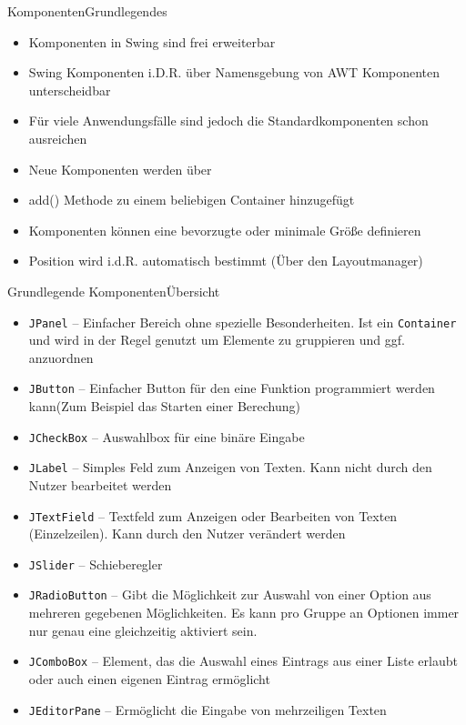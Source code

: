 \begin{frame}{Komponenten}{Grundlegendes}
    \begin{itemize}
        \item Komponenten in Swing sind frei erweiterbar
        \item Swing Komponenten i.D.R. über Namensgebung von AWT Komponenten unterscheidbar
        \item Für viele Anwendungsfälle sind jedoch die Standardkomponenten schon ausreichen
        \item Neue Komponenten werden über \item{add()} Methode zu einem beliebigen Container hinzugefügt
        \item Komponenten können eine bevorzugte oder minimale Größe definieren
        \item Position wird i.d.R. automatisch bestimmt (Über den Layoutmanager)
    \end{itemize}
\end{frame}

\begin{frame}[allowframebreaks]{Grundlegende Komponenten}{Übersicht}
    \begin{itemize}[<+->]
        \item \texttt{JPanel} -- Einfacher Bereich ohne spezielle Besonderheiten. Ist ein \texttt{Container} und wird in der Regel genutzt um Elemente zu gruppieren und ggf. anzuordnen
        \item \texttt{JButton} -- Einfacher Button für den eine Funktion programmiert werden kann(Zum Beispiel das Starten einer Berechung)
        \item \texttt{JCheckBox} -- Auswahlbox für eine binäre Eingabe
        \item \texttt{JLabel} -- Simples Feld zum Anzeigen von Texten. Kann nicht durch den Nutzer bearbeitet werden
        \item \texttt{JTextField} -- Textfeld zum Anzeigen oder Bearbeiten von Texten (Einzelzeilen). Kann durch den Nutzer verändert werden
        \item \texttt{JSlider} -- Schieberegler
        \item \texttt{JRadioButton} -- Gibt die Möglichkeit zur Auswahl von einer Option aus mehreren gegebenen Möglichkeiten. Es kann pro Gruppe an Optionen immer nur genau eine gleichzeitig aktiviert sein.
        \item \texttt{JComboBox} -- Element, das die Auswahl eines Eintrags aus einer Liste erlaubt oder auch einen eigenen Eintrag ermöglicht
        \item \texttt{JEditorPane} -- Ermöglicht die Eingabe von mehrzeiligen Texten
    \end{itemize}
\end{frame}

